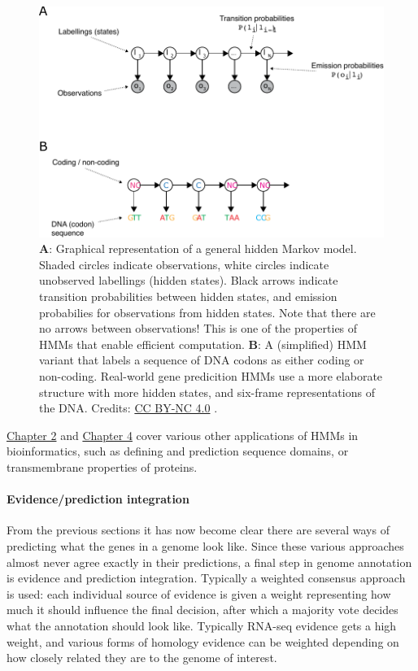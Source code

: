 \begin{framed}
\begin{figure}[!htbp]
\centering
\includegraphics[width=1\linewidth]{files/coding_hmm-22db191de15f76bd6deb9e5904ea2580.pdf}
\caption[]{\textbf{A}: Graphical representation of a general hidden Markov model. Shaded circles indicate observations, white circles indicate unobserved labellings (hidden states). Black arrows indicate transition probabilities between hidden states, and emission probabilies for observations from hidden states. Note that there are no arrows between observations! This is one of the properties of HMMs that enable efficient computation. \textbf{B}: A (simplified) HMM variant that labels a sequence of DNA codons as either coding or non-coding. Real-world gene predicition HMMs use a more elaborate structure with more hidden states, and six-frame representations of the DNA.
Credits: \href{https://creativecommons.org/licenses/by-nc/4.0/}{CC BY-NC 4.0} \cite{own_1_2024}.}
\label{coding_hmm}
\end{figure}

\href{/chapter2}{Chapter 2} and \href{/chapter4}{Chapter 4} cover various other applications of HMMs in bioinformatics, such as defining and prediction sequence domains, or transmembrane properties of proteins.
\end{framed}

\paragraph{Evidence/prediction integration}

From the previous sections it has now become clear there are several ways of predicting what the genes in a genome look like.
Since these various approaches almost never agree exactly in their predictions, a final step in genome annotation is evidence and prediction integration.
Typically a weighted consensus approach is used: each individual source of evidence is given a weight representing how much it should influence the final decision, after which a majority vote decides what the annotation should look like.
Typically RNA-seq evidence gets a high weight, and various forms of homology evidence can be weighted depending on how closely related they are to the genome of interest.

